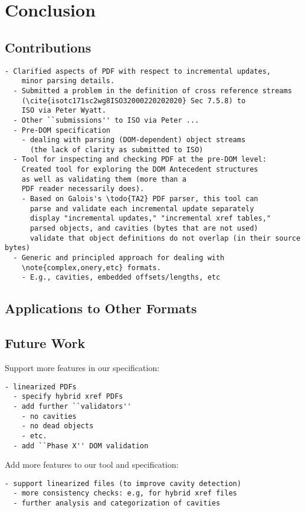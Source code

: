 \section{Conclusion }
\label{sec:conclusion}

\subsection{Contributions}

\begin{lstlisting}[style=meta]
  - Clarified aspects of PDF with respect to incremental updates,
    minor parsing details.
  - Submitted a problem in the definition of cross reference streams
    (\cite{isotc171sc2wg8ISO32000220202020} Sec 7.5.8) to
    ISO via Peter Wyatt.
  - Other ``submissions'' to ISO via Peter ...
  - Pre-DOM specification
    - dealing with parsing (DOM-dependent) object streams
      (the lack of clarity as submitted to ISO)
  - Tool for inspecting and checking PDF at the pre-DOM level:
    Created tool for exploring the DOM Antecedent structures
    as well as validating them (more than a
    PDF reader necessarily does).
    - Based on Galois's \todo{TA2} PDF parser, this tool can
      parse and validate each incremental update separately
      display "incremental updates," "incremental xref tables,"
      parsed objects, and cavities (bytes that are not used)
      validate that object definitions do not overlap (in their source bytes)
  - Generic and principled approach for dealing with
    \note{complex,onery,etc} formats.
    - E.g., cavities, embedded offsets/lengths, etc
\end{lstlisting}

\subsection{Applications to Other Formats}


\subsection{Future Work}

Support more features in our specification:
\begin{lstlisting}[style=meta]
  - linearized PDFs
  - specify hybrid xref PDFs
  - add further ``validators''
    - no cavities
    - no dead objects
    - etc.
  - add ``Phase X'' DOM validation
\end{lstlisting}

Add more features to our tool and specification:
\begin{lstlisting}[style=meta]
  - support linearized files (to improve cavity detection)
  - more consistency checks: e.g, for hybrid xref files
  - further analysis and categorization of cavities
\end{lstlisting}


